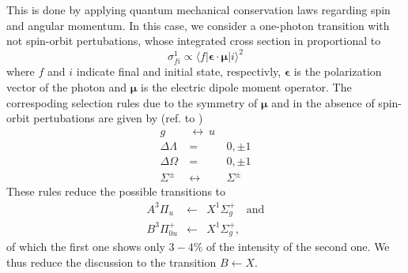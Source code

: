 This is done by applying quantum mechanical 
conservation laws regarding spin and angular momentum. In this case, 
we consider a one-photon transition with not spin-orbit pertubations, 
whose integrated cross section in proportional to
\begin{equation}
    \sigma_{fi}^1 \propto \langle f | \mathbf{\epsilon \cdot \mu} | i \rangle^2
\end{equation}
 where $f$ and $i$ indicate final and initial state, respectivly, 
$\mathbf{\epsilon}$ is the polarization vector of the photon and
$\mathbf{\mu}$ is the electric dipole moment operator. 
The correspoding selection rules due to the symmetry of $\mathbf{\mu}$ 
and in the absence of spin-orbit pertubations 
are given by (ref. to \cite{lefebvre2004spectra}) 
\begin{eqnarray}
    g  \ &\leftrightarrow \ u \\
    \Delta \Lambda \ &=&  \  0, \pm 1 \\
    \Delta \Omega \ &=& \ 0, \pm 1 \\
    \Sigma^\pm \ &\leftrightarrow& \ \Sigma^\pm
\end{eqnarray}
These rules reduce the possible transitions to 
\begin{eqnarray}
    A ^3\Pi_{u} &\leftarrow & X ^1\Sigma_g^+ \quad \mathrm{and} \\
    B ^3\Pi_{0u}^+ &\leftarrow & X ^1\Sigma_g^+, 
\end{eqnarray}
of which the first one shows only $3 - 4\%$ of the intensity of 
the second one. We thus reduce the discussion to the transition 
 $B \leftarrow X$. 

